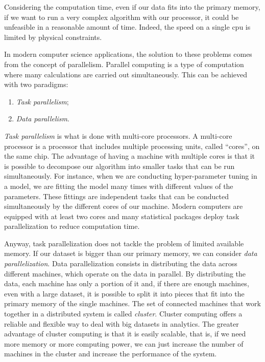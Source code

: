 \documentclass[a4paper, twoside, openright, 12pt]{report}
\providecommand{\tightlist}{%
  \setlength{\itemsep}{0pt}\setlength{\parskip}{0pt}}
\theoremstyle{definition}
\theoremstyle{definition}
\theoremstyle{definition}
\theoremstyle{remark}
\begin{document}
Considering the computation time, even if our data fits into the primary memory, if we want to run a very complex algorithm with our processor, it could be unfeasible in a reasonable amount of time. Indeed, the speed on a single \ac{cpu} is limited by physical constraints.

In modern computer science applications, the solution to these problems comes from the concept of parallelism. Parallel computing is a type of computation where many calculations are carried out simultaneously. This can be achieved with two paradigms:

\begin{enumerate}
\def\labelenumi{\arabic{enumi}.}
\tightlist
\item
  \emph{Task parallelism};
\item
  \emph{Data parallelism}.
\end{enumerate}

\emph{Task parallelism} is what is done with multi-core processors. A multi-core processor is a processor that includes multiple processing units, called ``cores'', on the same chip. The advantage of having a machine with multiple cores is that it is possible to decompose our algorithm into smaller tasks that can be run simultaneously. For instance, when we are conducting hyper-parameter tuning in a model, we are fitting the model many times with different values of the parameters. These fittings are independent tasks that can be conducted simultaneously by the different cores of our machine. Modern computers are equipped with at least two cores and many statistical packages deploy task parallelization to reduce computation time.

Anyway, task parallelization does not tackle the problem of limited available memory. If our dataset is bigger than our primary memory, we can consider \emph{data parallelization}. Data parallelization consists in distributing the data across different machines, which operate on the data in parallel. By distributing the data, each machine has only a portion of it and, if there are enough machines, even with a large dataset, it is possible to split it into pieces that fit into the primary memory of the single machines. The set of connected machines that work together in a distributed system is called \emph{cluster}. Cluster computing offers a reliable and flexible way to deal with big datasets in analytics. The greater advantage of cluster computing is that it is easily scalable, that is, if we need more memory or more computing power, we can just increase the number of machines in the cluster and increase the performance of the system.
\end{document}

